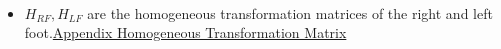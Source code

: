 \begin{enumerate}
\begin{equation}
\begin{split}
    \end{split}
\end{equation}
\begin{itemize}
\item $H_{RF},H_{LF}$ are the homogeneous transformation matrices of the right and left foot.\underline{Appendix Homogeneous Transformation Matrix}
\end{itemize}

\end{enumerate}

